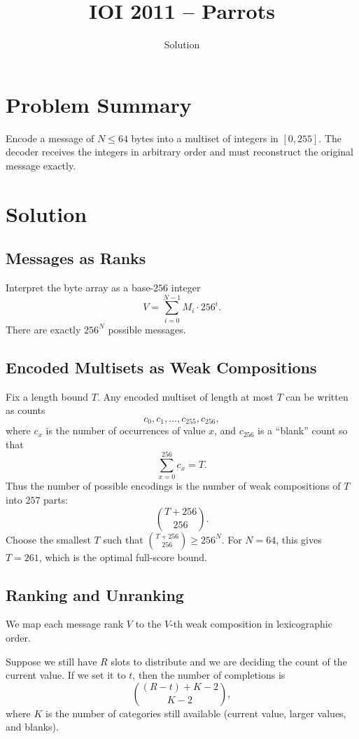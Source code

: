 \documentclass[11pt,a4paper]{article}
\title{IOI 2011 -- Parrots}
\author{Solution}
\date{}
\begin{document}
\maketitle

\section{Problem Summary}
Encode a message of $N \le 64$ bytes into a multiset of integers in $[0,255]$. The decoder receives the integers in arbitrary order and must reconstruct the original message exactly.

\section{Solution}

\subsection{Messages as Ranks}
Interpret the byte array as a base-$256$ integer
\[
V = \sum_{i=0}^{N-1} M_i \cdot 256^i .
\]
There are exactly $256^N$ possible messages.

\subsection{Encoded Multisets as Weak Compositions}
Fix a length bound $T$. Any encoded multiset of length at most $T$ can be written as counts
\[
c_0, c_1, \ldots, c_{255}, c_{256},
\]
where $c_x$ is the number of occurrences of value $x$, and $c_{256}$ is a ``blank'' count so that
\[
\sum_{x=0}^{256} c_x = T.
\]
Thus the number of possible encodings is the number of weak compositions of $T$ into $257$ parts:
\[
\binom{T + 256}{256}.
\]
Choose the smallest $T$ such that $\binom{T + 256}{256} \ge 256^N$. For $N = 64$, this gives $T = 261$, which is the optimal full-score bound.

\subsection{Ranking and Unranking}
We map each message rank $V$ to the $V$-th weak composition in lexicographic order.

Suppose we still have $R$ slots to distribute and we are deciding the count of the current value. If we set it to $t$, then the number of completions is
\[
\binom{(R - t) + K - 2}{K - 2},
\]
where $K$ is the number of categories still available (current value, larger values, and blanks).
\end{document}
